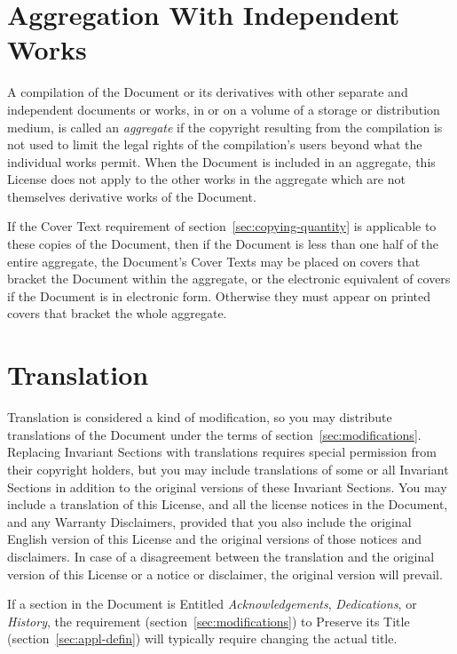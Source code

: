 \section{Aggregation With Independent Works}

A compilation of the Document or its derivatives with other separate
and independent documents or works, in or on a volume of a storage or
distribution medium, is called an \emph{aggregate} if the copyright
resulting from the compilation is not used to limit the legal rights
of the compilation's users beyond what the individual works permit.
When the Document is included in an aggregate, this License does not
apply to the other works in the aggregate which are not themselves
derivative works of the Document.

If the Cover Text requirement of section~\ref{sec:copying-quantity} is
applicable to these copies of the Document, then if the Document is
less than one half of the entire aggregate, the Document's Cover Texts
may be placed on covers that bracket the Document within the
aggregate, or the electronic equivalent of covers if the Document is
in electronic form.  Otherwise they must appear on printed covers that
bracket the whole aggregate.


\section{Translation}

Translation is considered a kind of modification, so you may
distribute translations of the Document under the terms of
section~\ref{sec:modifications}.  Replacing Invariant Sections with
translations requires special permission from their copyright holders,
but you may include translations of some or all Invariant Sections in
addition to the original versions of these Invariant Sections.  You
may include a translation of this License, and all the license notices
in the Document, and any Warranty Disclaimers, provided that you also
include the original English version of this License and the original
versions of those notices and disclaimers.  In case of a disagreement
between the translation and the original version of this License or a
notice or disclaimer, the original version will prevail.

If a section in the Document is Entitled \emph{Acknowledgements},
\emph{Dedications}, or \emph{History}, the requirement
(section~\ref{sec:modifications}) to Preserve its Title
(section~\ref{sec:appl-defin}) will typically require changing the
actual title.


